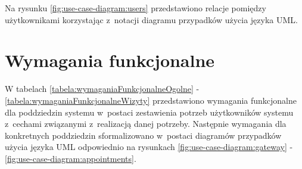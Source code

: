 Na rysunku \ref{fig:use-case-diagram:users} przedstawiono relacje pomiędzy użytkownikami korzystając z~notacji diagramu przypadków użycia języka UML.


\section{Wymagania funkcjonalne}\label{sec:functional-requirements}
\par
W tabelach \ref{tabela:wymaganiaFunkcjonalneOgolne} - \ref{tabela:wymaganiaFunkcjonalneWizyty} przedstawiono wymagania funkcjonalne dla poddziedzin systemu w~postaci zestawienia potrzeb użytkowników systemu z~cechami związanymi z~realizacją danej potrzeby.
Następnie wymagania dla konkretnych poddziedzin sformalizowano w~postaci diagramów przypadków użycia języka UML odpowiednio na rysunkach \ref{fig:use-case-diagram:gateway} - \ref{fig:use-case-diagram:appointments}.

